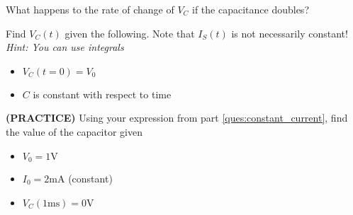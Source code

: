 \begin{enumerate}
\qitem\label{ques:double_C}What happens to the rate of change of $V_C$ if the capacitance doubles?


\qitem\label{ques:general_integrator}Find $V_C(t)$ given the following. Note that $I_S(t)$ is not necessarily constant! \textit{Hint: You can use integrals}
\begin{itemize}
	\item $V_C(t=0) = V_0$
	\item $C$ is constant with respect to time
\end{itemize}


\qitem\label{ques:constant_current_C}\textbf{(PRACTICE)} Using your expression from part \ref{ques:constant_current}, find the value of the capacitor given
	\begin{itemize}
		\item $V_0 = 1\si{\volt}$
		\item $I_0 = 2\si{\milli\ampere}$ (constant)
		\item $V_C(1\si{\milli\second}) = 0\si{\volt}$
	\end{itemize}

\sol{

}
\end{enumerate}
